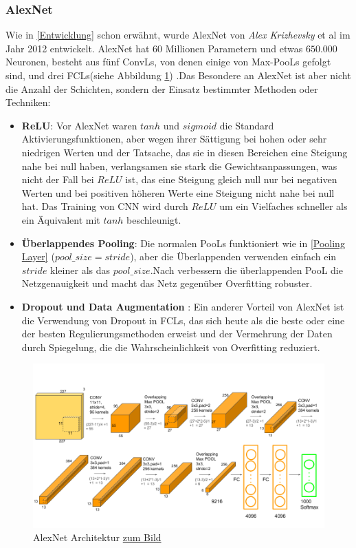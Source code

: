 \documentclass[12pt,a4paper]{scrartcl}
\numberwithin{equation}{section}
\begin{document}
\subsubsection{AlexNet}
Wie in \ref{Entwicklung} schon erwähnt, wurde AlexNet von \textit{Alex Krizhevsky} et al \cite{AlexNet} im Jahr 2012 entwickelt. AlexNet hat $ 60 $ Millionen Parametern und etwas $ 650.000 $ Neuronen, besteht aus fünf \acsp{ConvL}, von denen einige von Max-\acsp{PooL} gefolgt sind, und drei \acsp{FCL}(siehe Abbildung \ref{fig:AlexNet}) \cite{AlexNet}.Das Besondere an AlexNet ist aber nicht die Anzahl der Schichten, sondern der Einsatz bestimmter Methoden oder Techniken:
\begin{itemize}
	\item \textbf{ReLU}: Vor AlexNet waren $ tanh $ und $ sigmoid $ die Standard Aktivierungsfunktionen, aber wegen ihrer Sättigung bei hohen oder sehr niedrigen Werten und der Tatsache, das sie in diesen Bereichen eine Steigung nahe bei null haben, verlangsamen sie stark die Gewichtsanpassungen, was nicht der Fall bei $ ReLU $ ist, das eine Steigung gleich null nur bei negativen Werten und bei positiven höheren Werte  eine Steigung nicht nahe bei null hat. Das Training von \ac{CNN} wird durch $ ReLU $  um ein Vielfaches schneller als ein Äquivalent mit $ tanh $ beschleunigt\cite{AlexNet}.
	
	\item \textbf{Überlappendes Pooling}: Die normalen \acsp{PooL} funktioniert wie in \ref{Pooling Layer} ($ pool\_size = stride$), aber die Überlappenden verwenden einfach ein $ stride $ kleiner als das $ pool\_size $.Nach \cite{AlexNet} verbessern die überlappenden \ac{PooL}  die Netzgenauigkeit und macht das Netz gegenüber Overfitting robuster.
	\item \textbf{Dropout und Data Augmentation }: Ein anderer Vorteil von AlexNet ist die Verwendung von Dropout in \acsp{FCL}, das sich heute als die beste oder eine der besten Regulierungsmethoden erweist und der Vermehrung der Daten durch Spiegelung, die die Wahrscheinlichkeit von Overfitting reduziert.
\end{itemize}
\begin{figure}[h]
	\centering
	\includegraphics[width=\textwidth ]{AlexNet}
	\caption{ AlexNet Architektur \href{https://neurohive.io/en/popular-networks/alexnet-imagenet-classification-with-deep-convolutional-neural-networks/}{ zum Bild} }
	\label{fig:AlexNet}
\end{figure}
\end{document}
